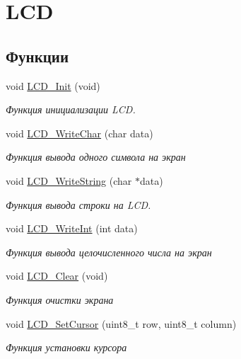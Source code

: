 \hypertarget{group___l_c_d}{}\section{L\+CD}
\label{group___l_c_d}
\subsection*{Функции}
\begin{DoxyCompactItemize}
\item 
void \mbox{\hyperlink{group___l_c_d_gaa53c9d40f3aa552a9974cd55ac510cb3}{L\+C\+D\+\_\+\+Init}} (void)
\begin{DoxyCompactList}\small\item\em Функция инициализации L\+CD. \end{DoxyCompactList}\item 
void \mbox{\hyperlink{group___l_c_d_gab0bfa8e6a5ecf32e685152b5c6cf4868}{L\+C\+D\+\_\+\+Write\+Char}} (char data)
\begin{DoxyCompactList}\small\item\em Функция вывода одного символа на экран \end{DoxyCompactList}\item 
void \mbox{\hyperlink{group___l_c_d_ga3f2811cf6b42d44a54d3ec825ed04872}{L\+C\+D\+\_\+\+Write\+String}} (char $\ast$data)
\begin{DoxyCompactList}\small\item\em Функция вывода строки на L\+CD. \end{DoxyCompactList}\item 
void \mbox{\hyperlink{group___l_c_d_ga37d2c714c039facd26673a1d46327048}{L\+C\+D\+\_\+\+Write\+Int}} (int data)
\begin{DoxyCompactList}\small\item\em Функция вывода целочисленного числа на экран \end{DoxyCompactList}\item 
void \mbox{\hyperlink{group___l_c_d_gae60d0b62d7eb3fa31266c095d7b3c245}{L\+C\+D\+\_\+\+Clear}} (void)
\begin{DoxyCompactList}\small\item\em Функция очистки экрана \end{DoxyCompactList}\item 
void \mbox{\hyperlink{group___l_c_d_ga9cb99b2bea272c3cf14ddd5679481398}{L\+C\+D\+\_\+\+Set\+Cursor}} (uint8\+\_\+t row, uint8\+\_\+t column)
\begin{DoxyCompactList}\small\item\em Функция установки курсора \end{DoxyCompactList}\end{DoxyCompactItemize}


